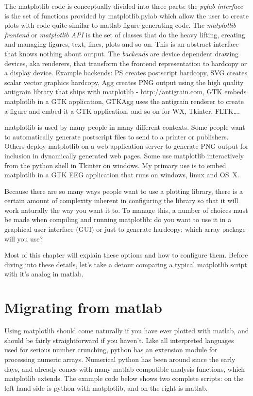 \documentclass[twoside]{book}
\begin{document}
The matplotlib code is conceptually divided into three parts: the
\textit{pylab interface} is the set of functions provided by
matplotlib.pylab which allow the user to create plots with code quite
similar to matlab figure generating code.  The \textit{matplotlib
  frontend} or \textit{matplotlib API} is the set of classes that do
the heavy lifting, creating and managing figures, text, lines, plots
and so on.  This is an abstract interface that knows nothing about
output.  The \textit{backends} are device dependent drawing devices,
aka renderers, that transform the frontend representation to hardcopy
or a display device.  Example backends: PS creates postscript
hardcopy, SVG creates scalar vector graphics hardcopy, Agg creates PNG
output using the high quality antigrain library that ships with
matplotlib - \url{http://antigrain.com}, GTK embeds matplotlib in a
GTK application, GTKAgg uses the antigrain renderer to create a figure
and embed it a GTK application, and so on for WX, Tkinter, FLTK\dots.

matplotlib is used by many people in many different contexts.  Some
people want to automatically generate postscript files to send to a
printer or publishers.  Others deploy matplotlib on a web application
server to generate PNG output for inclusion in dynamically generated
web pages.  Some use matplotlib interactively from the python shell in
Tkinter on windows.  My primary use is to embed matplotlib in a GTK
EEG application that runs on windows, linux and OS~X.

Because there are so many ways people want to use a plotting library,
there is a certain amount of complexity inherent in configuring the
library so that it will work naturally the way you want it to.  To
manage this, a number of choices must be made when compiling and
running matplotlib: do you want to use it in a graphical user
interface (GUI) or just to generate hardcopy; which array package will
you use?  

Most of this chapter will explain these options and how to configure
them.  Before diving into these details, let's take a detour comparing
a typical matplotlib script with it's analog in matlab.

\section{Migrating from matlab}
\label{sec:migrating}

Using matplotlib should come naturally if you have ever plotted with
matlab, and should be fairly straightforward if you haven't.  Like all
interpreted languages used for serious number crunching, python has an
extension module for processing numeric arrays.  Numerical python has
been around since the early days, and already comes with many matlab
compatible analysis functions, which matplotlib extends.  The example
code below shows two complete scripts: on the left hand side is python
with matplotlib, and on the right is matlab.  
\end{document}

